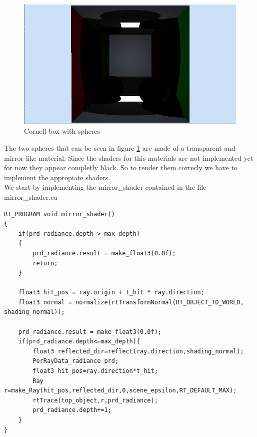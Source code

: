 \begin{figure}[H]
	\centering
	\includegraphics[scale=\imagescale]{images/project/7}
	\caption{Cornell box with spheres}
	\label{fig:cornell_spheres}
\end{figure}
The two spheres that can be seen in figure \ref{fig:cornell_spheres} are made of a transparent and mirror-like material. Since the shaders for this materials are not implemented yet for now they appear completly black. So to render them correcly we have to implement the appropiate shaders.\\
We start by implementing the mirror\_shader contained in the file mirror\_shader.cu
\begin{lstlisting}
RT_PROGRAM void mirror_shader()
{
	if(prd_radiance.depth > max_depth)
	{
		prd_radiance.result = make_float3(0.0f);
		return;
	}
	
	float3 hit_pos = ray.origin + t_hit * ray.direction;
	float3 normal = normalize(rtTransformNormal(RT_OBJECT_TO_WORLD, shading_normal));
	
	prd_radiance.result = make_float3(0.0f);
	if(prd_radiance.depth<=max_depth){
		float3 reflected_dir=reflect(ray.direction,shading_normal);
		PerRayData_radiance prd;
		float3 hit_pos=ray.direction*t_hit;
		Ray r=make_Ray(hit_pos,reflected_dir,0,scene_epsilon,RT_DEFAULT_MAX);
		rtTrace(top_object,r,prd_radiance);
		prd_radiance.depth+=1;
	}
}
\end{lstlisting}

